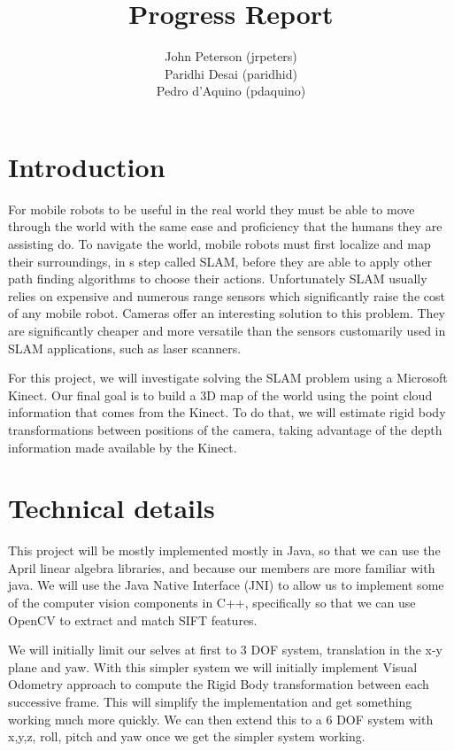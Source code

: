 \documentclass[12pt]{article}
\title{Progress Report}
\author{
	John Peterson (jrpeters)\\
	Paridhi Desai (paridhid)\\
	Pedro d'Aquino (pdaquino)}
\begin{document}
\maketitle

\section{Introduction}
For mobile robots to be useful in the real world they must be able to move through the world 
with the same ease and proficiency that the humans they are assisting do.  To navigate the world, 
mobile robots must first localize and map their surroundings, in s step called SLAM, before they are 
able to apply other path finding algorithms to choose their actions.   Unfortunately SLAM usually relies 
on expensive and numerous range sensors which significantly raise the cost of any mobile robot. Cameras
offer an interesting solution to this problem.  They are significantly cheaper and more versatile than the 
sensors customarily used in SLAM applications, such as laser scanners.

For this project, we will investigate solving the SLAM problem using a Microsoft Kinect. Our final goal is
to build a 3D map of the world using the point cloud information that comes from the Kinect. To do that, we
will estimate rigid body transformations between positions of the camera, taking advantage of the depth information
made available by the Kinect.

\section{Technical details}
This project will be mostly implemented mostly in Java, so that we can use the April linear algebra libraries, and because our members are more familiar with java.  We will use the Java Native Interface (JNI) to allow us to implement some of the computer vision components in C++, specifically so that we can use OpenCV to extract and match SIFT features.

	We will initially limit our selves at first to 3 DOF system, translation in the x-y plane and yaw.  With this simpler system we will initially implement Visual Odometry approach to compute the Rigid Body transformation between each successive frame. This will simplify the implementation and get something working much more quickly.   We can then extend this to a 6 DOF system with x,y,z, roll, pitch and yaw once we get the simpler system working.
	
\end{document}
